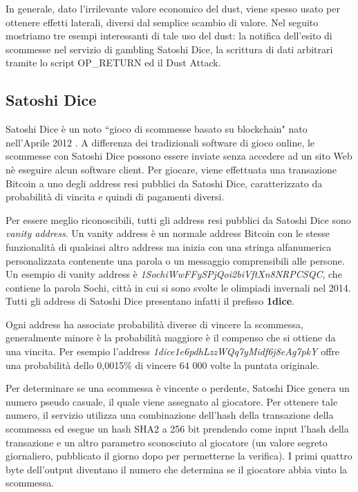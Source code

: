 In generale, dato l'irrilevante valore economico del dust, viene spesso usato per ottenere effetti laterali, diversi dal semplice scambio di valore. Nel seguito mostriamo tre esempi interessanti di tale uso del dust: la notifica dell'esito di scommesse nel servizio di gambling Satoshi Dice, la scrittura di dati arbitrari tramite lo script OP\_RETURN ed il Dust Attack.

\subsection{Satoshi Dice}
Satoshi Dice è un noto ``gioco di scommesse basato su blockchain" nato nell'Aprile 2012 \cite{SD}. A differenza dei tradizionali software di gioco online, le scommesse con Satoshi Dice possono essere inviate senza accedere ad un sito Web nè eseguire alcun software client. Per giocare, viene effettuata una transazione Bitcoin a uno degli address resi pubblici da Satoshi Dice, caratterizzato da probabilità di vincita e quindi di pagamenti diversi.

Per essere meglio riconoscibili, tutti gli address resi pubblici da Satoshi Dice sono \emph{vanity address}. Un vanity address è un normale address Bitcoin con le stesse funzionalità di qualsiasi altro address ma inizia con una stringa alfanumerica personalizzata contenente una parola o un messaggio comprensibili alle persone. Un esempio di vanity address è \textit{1SochiWwFFySPjQoi2biVftXn8NRPCSQC}, che contiene la parola Sochi, città in cui si sono svolte le olimpiadi invernali nel 2014. Tutti gli address di Satoshi Dice presentano infatti il prefisso \textbf{1dice}.

Ogni address ha associate probabilità diverse di vincere la scommessa, generalmente minore è la probabilità maggiore è il compenso che si ottiene da una vincita. Per esempio l'address \textit{1dice1e6pdhLzzWQq7yMidf6j8eAg7pkY} offre una probabilità dello 0,0015\% di vincere 64 000 volte la puntata originale.

Per determinare se una scommessa è vincente o perdente, Satoshi Dice genera un numero pseudo casuale, il quale viene assegnato al giocatore. Per ottenere tale numero, il servizio utilizza una combinazione dell'hash della transazione della scommessa ed esegue un hash SHA2 a 256 bit prendendo come input l'hash della transazione e un altro parametro sconosciuto al giocatore (un valore segreto giornaliero, pubblicato il giorno dopo per permetterne la verifica). I primi quattro byte dell'output diventano il numero che determina se il giocatore abbia vinto la scommessa.

